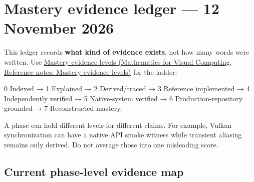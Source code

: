 \hypertarget{appendix-2358b21a702d}{}\label{referencestart:appendix-2358b21a702d}
\section{Mastery evidence ledger --- 12 November 2026}\label{appendix-2358b21a702d-mastery-evidence-ledger-12-november-2026}

\hypertarget{appendix-2358b21a702d-mastery-evidence-ledger-12-november-2026}{}

This ledger records \textbf{what kind of evidence exists}, not how many words were written. Use \href{../02-Mathematics-for-Visual-Computing/main.pdf\#nameddest=appendix-2a2e5bd7143a}{Mastery evidence levels (Mathematics for Visual Computing, Reference notes: Mastery evidence levels)} for the ladder:

0 Indexed → 1 Explained → 2 Derived/traced → 3 Reference implemented → 4 Independently verified → 5 Native-system verified → 6 Production-repository grounded → 7 Reconstructed mastery.

A phase can hold different levels for different claims. For example, Vulkan synchronization can have a native API smoke witness while transient aliasing remains only derived. Do not average those into one misleading score.

\subsection{Current phase-level evidence map}\label{appendix-2358b21a702d-current-phase-level-evidence-map}

\hypertarget{appendix-2358b21a702d-current-phase-level-evidence-map}{}

